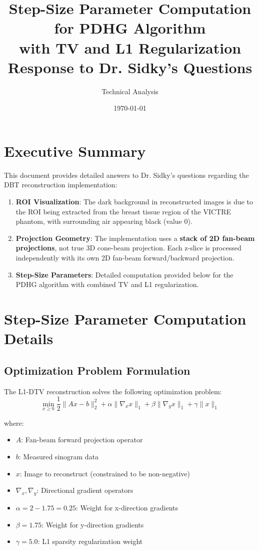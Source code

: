 \documentclass[11pt]{article}
\title{Step-Size Parameter Computation for PDHG Algorithm\\
with TV and L1 Regularization\\
\large Response to Dr. Sidky's Questions}
\author{Technical Analysis}
\date{\today}
\begin{document}
\maketitle

\section{Executive Summary}

This document provides detailed answers to Dr. Sidky's questions regarding the DBT reconstruction implementation:

\begin{enumerate}
    \item \textbf{ROI Visualization}: The dark background in reconstructed images is due to the ROI being extracted from the breast tissue region of the VICTRE phantom, with surrounding air appearing black (value 0).
    
    \item \textbf{Projection Geometry}: The implementation uses a \textbf{stack of 2D fan-beam projections}, not true 3D cone-beam projection. Each z-slice is processed independently with its own 2D fan-beam forward/backward projection.
    
    \item \textbf{Step-Size Parameters}: Detailed computation provided below for the PDHG algorithm with combined TV and L1 regularization.
\end{enumerate}

\section{Step-Size Parameter Computation Details}

\subsection{Optimization Problem Formulation}

The L1-DTV reconstruction solves the following optimization problem:
\begin{equation}
\min_{x \geq 0} \frac{1}{2}\|Ax - b\|_2^2 + \alpha\|\nabla_x x\|_1 + \beta\|\nabla_y x\|_1 + \gamma\|x\|_1
\end{equation}

where:
\begin{itemize}
    \item $A$: Fan-beam forward projection operator
    \item $b$: Measured sinogram data
    \item $x$: Image to reconstruct (constrained to be non-negative)
    \item $\nabla_x, \nabla_y$: Directional gradient operators
    \item $\alpha = 2 - 1.75 = 0.25$: Weight for x-direction gradients
    \item $\beta = 1.75$: Weight for y-direction gradients
    \item $\gamma = 5.0$: L1 sparsity regularization weight
\end{itemize}
\end{document}
